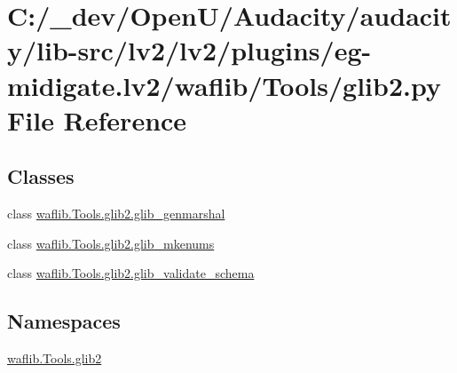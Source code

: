\hypertarget{lv2_2plugins_2eg-midigate_8lv2_2waflib_2_tools_2glib2_8py}{}\section{C\+:/\+\_\+dev/\+Open\+U/\+Audacity/audacity/lib-\/src/lv2/lv2/plugins/eg-\/midigate.lv2/waflib/\+Tools/glib2.py File Reference}
\label{lv2_2plugins_2eg-midigate_8lv2_2waflib_2_tools_2glib2_8py}
\subsection*{Classes}
\begin{DoxyCompactItemize}
\item 
class \hyperlink{classwaflib_1_1_tools_1_1glib2_1_1glib__genmarshal}{waflib.\+Tools.\+glib2.\+glib\+\_\+genmarshal}
\item 
class \hyperlink{classwaflib_1_1_tools_1_1glib2_1_1glib__mkenums}{waflib.\+Tools.\+glib2.\+glib\+\_\+mkenums}
\item 
class \hyperlink{classwaflib_1_1_tools_1_1glib2_1_1glib__validate__schema}{waflib.\+Tools.\+glib2.\+glib\+\_\+validate\+\_\+schema}
\end{DoxyCompactItemize}
\subsection*{Namespaces}
\begin{DoxyCompactItemize}
\item 
 \hyperlink{namespacewaflib_1_1_tools_1_1glib2}{waflib.\+Tools.\+glib2}
\end{DoxyCompactItemize}
